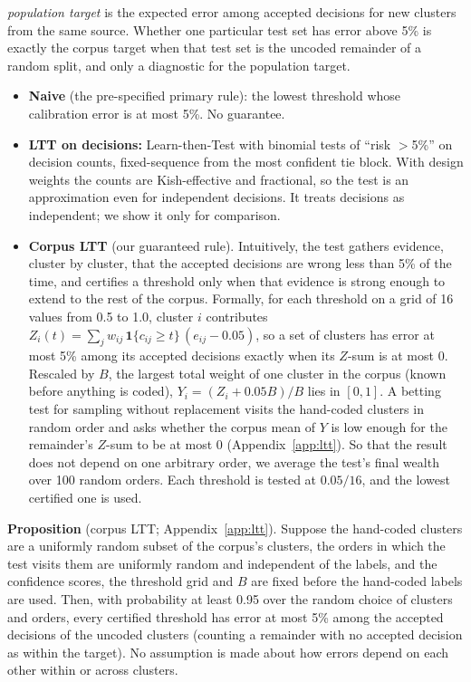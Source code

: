 \emph{population target} is the expected error among accepted decisions for new clusters from the same source. Whether one
particular test set has error above 5\% is exactly the corpus target when that test set is the uncoded remainder of a
random split, and only a diagnostic for the population target.
\begin{itemize}
  \item \textbf{Naive} (the pre-specified primary rule): the lowest threshold whose calibration error is at most 5\%. No guarantee.
  \item \textbf{LTT on decisions:} Learn-then-Test \citep{angelopoulos2025ltt} with binomial tests of ``risk $>$5\%'' on
  decision counts, fixed-sequence from the most confident tie block. With design weights the counts are Kish-effective and
  fractional, so the test is an approximation even for independent decisions. It treats decisions as independent; we show it
  only for comparison.
  \item \textbf{Corpus LTT} (our guaranteed rule). Intuitively, the test gathers evidence, cluster by cluster, that the
  accepted decisions are wrong less than 5\% of the time, and certifies a threshold only when that evidence is strong enough
  to extend to the rest of the corpus. Formally, for each threshold on a grid of 16 values from 0.5 to 1.0, cluster $i$
  contributes $Z_i(t)=\sum_j w_{ij}\,\mathbf{1}\{c_{ij}\ge t\}\,(e_{ij}-0.05)$, so a set of clusters has error at most 5\% among
  its accepted decisions exactly when its $Z$-sum is at most 0. Rescaled by $B$, the largest total weight of one cluster in the
  corpus (known before anything is coded), $Y_i=(Z_i+0.05B)/B$ lies in $[0,1]$. A betting test for sampling without
  replacement \citep{waudbysmith2024betting} visits the hand-coded clusters in random order and asks whether the corpus mean
  of $Y$ is low enough for the remainder's $Z$-sum to be at most 0 (Appendix~\ref{app:ltt}). So that the result does not
  depend on one arbitrary order, we average the test's final wealth over 100 random orders. Each threshold is tested at
  $0.05/16$, and the lowest certified one is used.
\end{itemize}
\noindent\textbf{Proposition} (corpus LTT; Appendix~\ref{app:ltt}). Suppose the hand-coded clusters are a uniformly random
subset of the corpus's clusters, the orders in which the test visits them are uniformly random and independent of the labels,
and the confidence scores, the threshold grid and $B$ are fixed before the hand-coded labels are used. Then, with probability
at least 0.95 over the random choice of clusters and orders, every certified threshold has error at most 5\% among the
accepted decisions of the uncoded clusters (counting a remainder with no accepted decision as within the target). No
assumption is made about how errors depend on each other within or across clusters.

